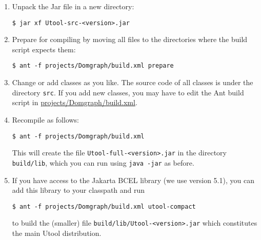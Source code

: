 \begin{enumerate}
\item Unpack the Jar file in a new directory:
\begin{verbatim}
$ jar xf Utool-src-<version>.jar
\end{verbatim}

\item Prepare for compiling by moving all files to the directories
where the build script expects them:
\begin{verbatim}
$ ant -f projects/Domgraph/build.xml prepare
\end{verbatim}

\item Change or add classes as you like. The source code of all
classes is under the directory \verb?src?. If you add new classes, you
may have to edit the Ant build script in
\url{projects/Domgraph/build.xml}.

\item Recompile as follows:
\begin{verbatim}
$ ant -f projects/Domgraph/build.xml 
\end{verbatim}

This will create the file \verb?Utool-full-<version>.jar? in the
directory \verb?build/lib?, which you can run using \verb?java -jar?
as before. 

\item If you have access to the Jakarta BCEL library (we use
version 5.1), you can add this library to your classpath and run

\begin{verbatim}
$ ant -f projects/Domgraph/build.xml utool-compact
\end{verbatim}

to build the (smaller) file \verb?build/lib/Utool-<version>.jar?
which constitutes the main Utool distribution.
\end{enumerate}






